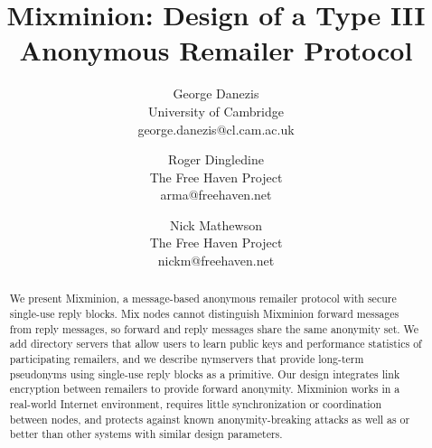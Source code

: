 \documentclass[times,10pt,twocolumn]{article}
\newcommand\emailaddr{\begingroup \def\UrlLeft{<}\def\UrlRight{>}\urlstyle{tt}\Url}
\begin{document}

\title{Mixminion: Design of a Type III Anonymous Remailer Protocol}

\author{George Danezis \\ University of Cambridge \\ george.danezis@cl.cam.ac.uk \and
Roger Dingledine \\ The Free Haven Project \\ arma@freehaven.net \and
Nick Mathewson \\ The Free Haven Project \\ nickm@freehaven.net}

\maketitle
\thispagestyle{empty}

\begin{abstract}
We present Mixminion, a message-based anonymous remailer protocol with
secure single-use reply blocks. Mix nodes cannot distinguish
Mixminion forward messages from reply messages, so forward and reply
messages share
the same anonymity set. We add directory servers that allow users to
learn public keys and performance statistics of participating remailers,
and we describe nymservers that provide long-term
pseudonyms using single-use reply blocks as a primitive. Our design
integrates link encryption between remailers to provide
forward anonymity. Mixminion works in a real-world Internet environment,
requires little synchronization or coordination between nodes, and
protects against known anonymity-breaking attacks as well
as or better than other systems with similar design parameters.
\end{abstract}



\label{sec:intro}
\end{document}
